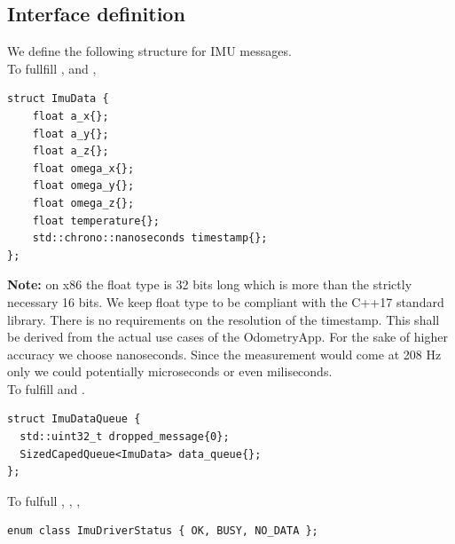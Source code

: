 \subsection{Interface definition}
We define the following structure for IMU messages.\\
To fullfill ,  and ,
\begin{lstlisting}[style=cppstyle]
struct ImuData {
    float a_x{};
    float a_y{};
    float a_z{};
    float omega_x{};
    float omega_y{};
    float omega_z{};
    float temperature{};
    std::chrono::nanoseconds timestamp{};
};
\end{lstlisting}
\textbf{Note:} on x86 the float type is 32 bits long which is more than the strictly necessary 16 bits. We keep float type to be compliant with the C++17 standard library.
There is no requirements on the resolution of the timestamp. This shall be derived from the actual use cases of the OdometryApp.
For the sake of higher accuracy we choose nanoseconds.
Since the measurement would come at 208 Hz only we could potentially microseconds or even miliseconds.\\

To fulfill  and .
\begin{lstlisting}[style=cppstyle]
struct ImuDataQueue {
  std::uint32_t dropped_message{0};
  SizedCapedQueue<ImuData> data_queue{};
};
\end{lstlisting}

To fulfull , , ,
\begin{lstlisting}[style=cppstyle]
enum class ImuDriverStatus { OK, BUSY, NO_DATA };
\end{lstlisting}

